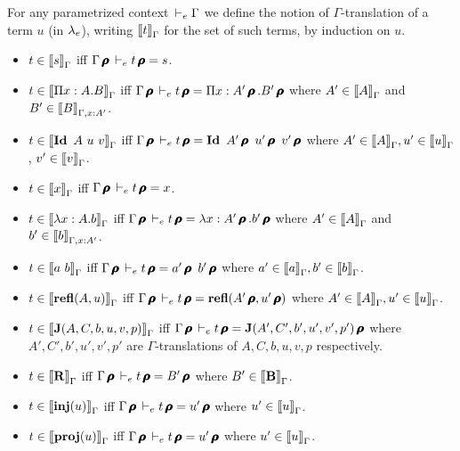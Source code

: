 \documentclass[a4paper,english]{lipics-utf8x}
\begin{document}
  \begin{definition}
    For any parametrized context $\dere \Gamma$ we define the notion of
    $\Gamma$-translation of a term $u$ (in $\Se$), writing $\tr{t}{\Gamma}$ for
    the set of such terms, by induction on $u$.
    \begin{itemize}
      \item $t \in \tr{s}{\Gamma}$ iff
            $\Gamma\prfl \dere t\prfl = s$.
      \item $t \in \tr{\Pi x:A.B}{\Gamma}$ iff
            $\Gamma\prfl \dere t\prfl =
            \Pi x:A'\prfl.B'\prfl$ where
            $A' \in \tr{A}{\Gamma}$ and $B' \in \tr{B}{\Gamma, x:A'}$.
      \item $t \in \tr{\Id A\ u\ v}{\Gamma}$ iff
            $\Gamma\prfl \dere t\prfl = \Id A'\prfl\ u'\prfl\ %
            v'\prfl$ where $A' \in \tr{A}{\Gamma}, u' \in \tr{u}{\Gamma}$,
            $v' \in \tr{v}{\Gamma}$.
      \item $t \in \tr{x}{\Gamma}$ iff
            $\Gamma\prfl \dere t\prfl = x$.
      \item $t \in \tr{\lambda x:A.b}{\Gamma}$ iff
            $\Gamma\prfl \dere t\prfl = \lambda x:A'\prfl.b'\prfl$
            where $A' \in \tr{A}{\Gamma}$ and $b' \in \tr{b}{\Gamma, x:A'}$.
      \item $t \in \tr{a\ b}{\Gamma}$ iff
            $\Gamma\prfl \dere t\prfl = a'\prfl\ b'\prfl$ where
            $a' \in \tr{a}{\Gamma}, b' \in \tr{b}{\Gamma}$.
      \item $t \in \tr{\refl(A,u)}{\Gamma}$ iff
            $\Gamma\prfl \dere t\prfl = \refl(A'\prfl,u'\prfl)$ where
            $A' \in \tr{A}{\Gamma}, u' \in \tr{u}{\Gamma}$.
      \item \sloppy
            $t \in \tr{\J(A,C,b,u,v,p)}{\Gamma}$ iff
            $\Gamma\prfl \dere t\prfl = \J(A',C',b',u',v',p')\prfl$
            where $A',C',b',u',v',p'$ are $\Gamma$-translations of
            $A,C,b,u,v,p$ respectively.
      \item $t \in \tr{\mR}{\Gamma}$ iff
            $\Gamma\prfl \dere t\prfl = B'\prfl$ where
            $B' \in \tr{\mB}{\Gamma}$.
      \item $t \in \tr{\inj(u)}{\Gamma}$ iff
            $\Gamma\prfl \dere t\prfl = u'\prfl$ where
            $u' \in \tr{u}{\Gamma}$.
      \item $t \in \tr{\proj(u)}{\Gamma}$ iff
            $\Gamma\prfl \dere t\prfl = u'\prfl$ where
            $u' \in \tr{u}{\Gamma}$.
    \end{itemize}
  \end{definition}
\end{document}
